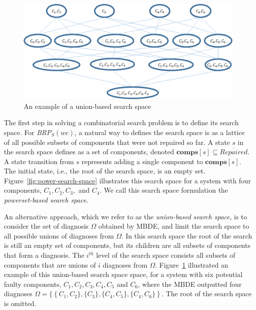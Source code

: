 \documentclass[review]{elsarticle}
\newtheorem{definition}{Definition}
\newcommand{\notrepaired}{{\overline{\textit{Repaired}}}}
\newcommand{\brpswc}{\textit{BRP$_S(wc)$}}
\newcommand{\comps}{\textbf{comps}}
\begin{document}
\begin{figure}
\centering
\includegraphics[width=0.85\columnwidth]{UnionBasedSearch.png}
\caption{An example of a union-based search space}%
\label{fig:union-search-space}
\end{figure}

The first step in solving a combinatorial search problem is to define its search space. 
For \brpswc{}, a natural way to defines the search space is as a lattice of all possible subsets of components that were not repaired so far. A state $s$ in the search space defines as a set of components, denoted $\comps[s]\subseteq\notrepaired{}$. 
A state transition from $s$ represents adding a single component to $\comps[s]$. 
The initial state, i.e., the root of the search space, is an empty set. %
 	Figure~\ref{fig:power-search-space} illustrates this search space for a system with four components, $C_1, C_2, C_3,$ and $C_4$. We call this search space formulation the {\em powerset-based search space}. 
	
	
	An alternative approach, which we refer to as the {\em union-based search space}, 
	is to consider the set of diagnosis $\Omega$ obtained by MBDE, 
	and limit the search space to all possible unions of diagnoses from $\Omega$. In this search space the root of the search is still an empty set of components, but its children are all subsets of components that form a diagnosis. The $i^{th}$ level of the search space consists all subsets of components that are unions of $i$ diagnoses from $\Omega$.  Figure~\ref{fig:union-search-space} illustrated an example of this union-based search space space, for a system with six potential faulty components, $C_1, C_2, C_3, C_4, C_5$ and $C_6$, where the MBDE outputted four diagnoses $\Omega=\{\left \{C_1, C_2\}, \{C_3\}, 
	\{C_4, C_5\}, \{C_4, C_6\}\right\}$. The root of the search space is omitted. 
	
\end{document}

